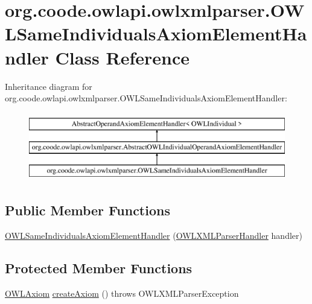 \hypertarget{classorg_1_1coode_1_1owlapi_1_1owlxmlparser_1_1_o_w_l_same_individuals_axiom_element_handler}{\section{org.\-coode.\-owlapi.\-owlxmlparser.\-O\-W\-L\-Same\-Individuals\-Axiom\-Element\-Handler Class Reference}
\label{classorg_1_1coode_1_1owlapi_1_1owlxmlparser_1_1_o_w_l_same_individuals_axiom_element_handler}
}
Inheritance diagram for org.\-coode.\-owlapi.\-owlxmlparser.\-O\-W\-L\-Same\-Individuals\-Axiom\-Element\-Handler\-:\begin{figure}[H]
\begin{center}
\leavevmode
\includegraphics[height=3.000000cm]{classorg_1_1coode_1_1owlapi_1_1owlxmlparser_1_1_o_w_l_same_individuals_axiom_element_handler}
\end{center}
\end{figure}
\subsection*{Public Member Functions}
\begin{DoxyCompactItemize}
\item 
\hyperlink{classorg_1_1coode_1_1owlapi_1_1owlxmlparser_1_1_o_w_l_same_individuals_axiom_element_handler_adaf42ce786792bb24223261b999703f1}{O\-W\-L\-Same\-Individuals\-Axiom\-Element\-Handler} (\hyperlink{classorg_1_1coode_1_1owlapi_1_1owlxmlparser_1_1_o_w_l_x_m_l_parser_handler}{O\-W\-L\-X\-M\-L\-Parser\-Handler} handler)
\end{DoxyCompactItemize}
\subsection*{Protected Member Functions}
\begin{DoxyCompactItemize}
\item 
\hyperlink{interfaceorg_1_1semanticweb_1_1owlapi_1_1model_1_1_o_w_l_axiom}{O\-W\-L\-Axiom} \hyperlink{classorg_1_1coode_1_1owlapi_1_1owlxmlparser_1_1_o_w_l_same_individuals_axiom_element_handler_acf38d921cfed579bad2a3e2455ab1253}{create\-Axiom} ()  throws O\-W\-L\-X\-M\-L\-Parser\-Exception 
\end{DoxyCompactItemize}


